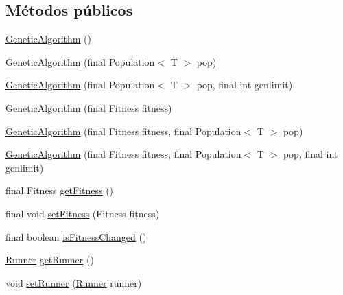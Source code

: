 \subsection*{Métodos públicos}
\begin{DoxyCompactItemize}
\item 
\hyperlink{classjenes_1_1_genetic_algorithm_3_01_t_01extends_01_chromosome_01_4_acfda239e0d2154eb26a7be4f6aa1315d}{Genetic\-Algorithm} ()
\item 
\hyperlink{classjenes_1_1_genetic_algorithm_3_01_t_01extends_01_chromosome_01_4_aede3d2fbd3c3d1cf04a4e419649cae93}{Genetic\-Algorithm} (final Population$<$ T $>$ pop)
\item 
\hyperlink{classjenes_1_1_genetic_algorithm_3_01_t_01extends_01_chromosome_01_4_afe0501230c1645d2a6cdf54af2672639}{Genetic\-Algorithm} (final Population$<$ T $>$ pop, final int genlimit)
\item 
\hyperlink{classjenes_1_1_genetic_algorithm_3_01_t_01extends_01_chromosome_01_4_aefcf45276a730906c98ff8de90b6c48e}{Genetic\-Algorithm} (final Fitness fitness)
\item 
\hyperlink{classjenes_1_1_genetic_algorithm_3_01_t_01extends_01_chromosome_01_4_a08a57814b09412baed3146d2cc6e2174}{Genetic\-Algorithm} (final Fitness fitness, final Population$<$ T $>$ pop)
\item 
\hyperlink{classjenes_1_1_genetic_algorithm_3_01_t_01extends_01_chromosome_01_4_af3997e737162629c161c04a65dd830a0}{Genetic\-Algorithm} (final Fitness fitness, final Population$<$ T $>$ pop, final int genlimit)
\item 
final Fitness \hyperlink{classjenes_1_1_genetic_algorithm_3_01_t_01extends_01_chromosome_01_4_a687996ee45582145be24e2086fc8c210}{get\-Fitness} ()
\item 
final void \hyperlink{classjenes_1_1_genetic_algorithm_3_01_t_01extends_01_chromosome_01_4_aff762153c3f11a2ad83936867ca31617}{set\-Fitness} (Fitness fitness)
\item 
final boolean \hyperlink{classjenes_1_1_genetic_algorithm_3_01_t_01extends_01_chromosome_01_4_a7d5cb4716cbc586aa85774c5dc934d15}{is\-Fitness\-Changed} ()
\item 
\hyperlink{classjenes_1_1utils_1_1multitasking_1_1_runner}{Runner} \hyperlink{classjenes_1_1_genetic_algorithm_3_01_t_01extends_01_chromosome_01_4_a63ea13380fe4a30d1eabd394e44d6e96}{get\-Runner} ()
\item 
void \hyperlink{classjenes_1_1_genetic_algorithm_3_01_t_01extends_01_chromosome_01_4_a6ff8bcd8e9049106c7959637e4e10e70}{set\-Runner} (\hyperlink{classjenes_1_1utils_1_1multitasking_1_1_runner}{Runner} runner)

\end{DoxyCompactItemize}
